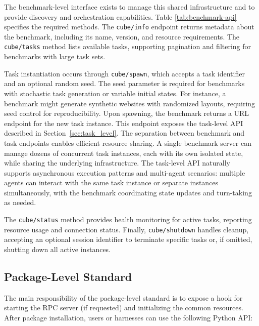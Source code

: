 \documentclass{article}
\theoremstyle{plain}
\theoremstyle{definition}
\theoremstyle{remark}
\begin{document}
The benchmark-level interface exists to manage this shared infrastructure and to provide discovery and orchestration capabilities. Table \ref{tab:benchmark-api} specifies the required methods. The \texttt{cube/info} endpoint returns metadata about the benchmark, including its name, version, and resource requirements. The \texttt{cube/tasks} method lists available tasks, supporting pagination and filtering for benchmarks with large task sets.

Task instantiation occurs through \texttt{cube/spawn}, which accepts a task identifier and an optional random seed. The seed parameter is required for benchmarks with stochastic task generation or variable initial states. For instance, a benchmark might generate synthetic websites with randomized layouts, requiring seed control for reproducibility. Upon spawning, the benchmark returns a URL endpoint for the new task instance. This endpoint exposes the task-level API described in Section~\ref{sec:task_level}. The separation between benchmark and task endpoints enables efficient resource sharing. A single benchmark server can manage dozens of concurrent task instances, each with its own isolated state, while sharing the underlying infrastructure. The task-level API naturally supports asynchronous execution patterns and multi-agent scenarios: multiple agents can interact with the same task instance or separate instances simultaneously, with the benchmark coordinating state updates and turn-taking as needed.

The \texttt{cube/status} method provides health monitoring for active tasks, reporting resource usage and connection status. Finally, \texttt{cube/shutdown} handles cleanup, accepting an optional session identifier to terminate specific tasks or, if omitted, shutting down all active instances.

\subsection{Package-Level Standard}
\label{sec:package_level}

The main responsibility of the package-level standard is to expose a hook for starting the RPC server (if requested) and initializing the common resources. After package installation, users or harnesses can use the following Python API:

\end{document}
